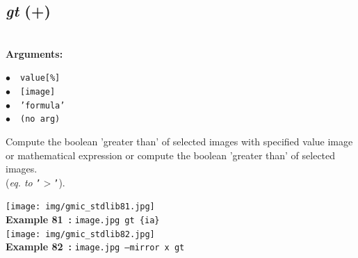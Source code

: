\documentclass[a4paper,10.5pt,twoside]{book}
\def\comma{\discretionary{,}{}{,}}
\newcommand{\Cb}[1]{\textcolor{cb}{#1}}
\begin{document}
\subsection{\emph{gt} (+)}\vspace*{-0.7em}
~\\\textbf{\Cb{Arguments: }}\begin{flushleft}
{\small \Cb{\hspace*{0.5cm}$\bullet$~~\texttt{value[\%]}}}~~~\\
{\small \Cb{\hspace*{0.5cm}$\bullet$~~\texttt{[image]}}}~~~\\
{\small \Cb{\hspace*{0.5cm}$\bullet$~~\texttt{'formula'}}}~~~\\
{\small \Cb{\hspace*{0.5cm}$\bullet$~~\texttt{(no arg)}}}\end{flushleft}
Compute the boolean 'greater than' of selected images with specified value{\comma} image or
mathematical expression{\comma} or compute the boolean 'greater than' of selected images.
~\\(\emph{eq. to} {\small \texttt{'$>$'}}).
\begin{center}\texttt{[image: img/gmic\_stdlib81.jpg]}\\
{\footnotesize \textbf{Example 81~:} \texttt{image.jpg gt \{ia\}}}
\\\texttt{[image: img/gmic\_stdlib82.jpg]}\\
{\footnotesize \textbf{Example 82~:} \texttt{image.jpg --mirror x gt}}
\end{center}
\end{document}
